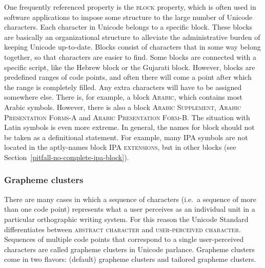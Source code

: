 One frequently referenced property is the \textsc{block} property, which is
often used in software applications to impose some structure to the large number
of Unicode characters. Each character in Unicode belongs to a specific block.
These blocks are basically an organizational structure to alleviate the
administrative burden of keeping Unicode up-to-date. Blocks consist of
characters that in some way belong together, so that characters are easier to
find. Some blocks are connected with a specific script, like the Hebrew block or
the Gujarati block. However, blocks are predefined ranges of code points, and
often there will come a point after which the range is completely filled. Any
extra characters will have to be assigned somewhere else. There is, for example,
a block \textsc{Arabic}, which contains most Arabic symbols. However, there is
also a block \textsc{Arabic Supplement}, \textsc{Arabic Presentation Forms-A}
and \textsc{Arabic Presentation Form-B}. The situation with Latin symbols is
even more extreme. In general, the names for block should not be taken as a
definitional statement. For example, many IPA symbols are not located in the
aptly-names block \textsc{IPA extensions}, but in other blocks
(see Section~\ref{pitfall-no-complete-ipa-block}).

\subsubsection*{Grapheme clusters}

There are many cases in which a sequence of characters (i.e.~a sequence of more
than one code point) represents what a user perceives as an individual unit in a
particular orthographic writing system. For this reason the Unicode Standard
differentiates between \textsc{abstract character} and \textsc{user-perceived
character}. Sequences of multiple code points that correspond to a single
user-perceived characters are called grapheme clusters in Unicode parlance.
Grapheme clusters come in two flavors: (default) grapheme clusters and tailored
grapheme clusters.

